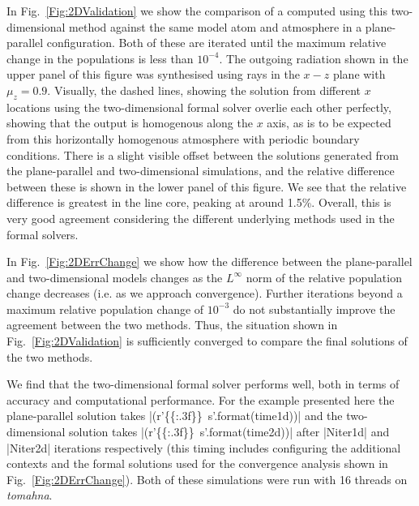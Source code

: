 In Fig.~\ref{Fig:2DValidation} we show the comparison of a \CaLine{} computed using this two-dimensional method against the same model atom and atmosphere in a plane-parallel configuration.
Both of these are iterated until the maximum relative change in the \Caii{} populations is less than $10^{-4}$.
The outgoing radiation shown in the upper panel of this figure was synthesised using rays in the $x-z$ plane with $\mu_z = 0.9$.
Visually, the dashed lines, showing the solution from different $x$ locations using the two-dimensional formal solver overlie each other perfectly, showing that the output is homogenous along the $x$ axis, as is to be expected from this horizontally homogenous atmosphere with periodic boundary conditions.
There is a slight visible offset between the solutions generated from the plane-parallel and two-dimensional simulations, and the relative difference between these is shown in the lower panel of this figure.
We see that the relative difference is greatest in the line core, peaking at around 1.5\%.
Overall, this is very good agreement considering the different underlying methods used in the formal solvers.

In Fig.~\ref{Fig:2DErrChange} we show how the difference between the plane-parallel and two-dimensional models changes as the $L^\infty$ norm of the relative population change decreases (i.e. as we approach convergence).
Further iterations beyond a maximum relative population change of $10^{-3}$ do not substantially improve the agreement between the two methods.
Thus, the situation shown in Fig.~\ref{Fig:2DValidation} is sufficiently converged to compare the final solutions of the two methods.

We find that the two-dimensional formal solver performs well, both in terms of accuracy and computational performance. For the example presented here the plane-parallel solution takes \py[2DValidation]|(r'\SI{{{:.3f}}}{{\second}}'.format(time1d))| and the two-dimensional solution takes \py[2DValidation]|(r'\SI{{{:.3f}}}{{\second}}'.format(time2d))| after \py[2DValidation]|Niter1d| and \py[2DValidation]|Niter2d| iterations respectively (this timing includes configuring the additional contexts and the formal solutions used for the convergence analysis shown in Fig.~\ref{Fig:2DErrChange}).
Both of these simulations were run with 16 threads on \emph{tomahna}.

